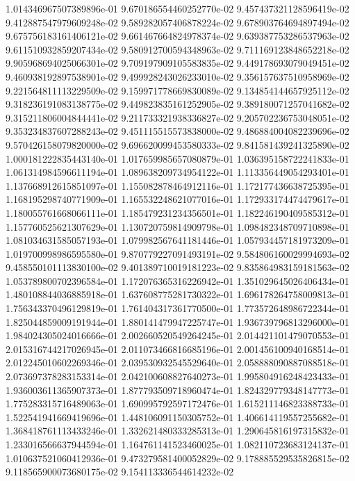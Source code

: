 1.014346967507389896e-01
9.670186554460252770e-02
9.457437321128596419e-02
9.412887547979609248e-02
9.589282057406878224e-02
9.678903764694897494e-02
9.675756183161406121e-02
9.661467664824978374e-02
9.639387753286537963e-02
9.611510932859207434e-02
9.580912700594348963e-02
9.711169123848652218e-02
9.905968694025066301e-02
9.709197909105583835e-02
9.449178693079049451e-02
9.460938192897538901e-02
9.499928243026233010e-02
9.356157637510958969e-02
9.221564811113229509e-02
9.159971778669830089e-02
9.134854144657925112e-02
9.318236191083138775e-02
9.449823835161252905e-02
9.389180071257041682e-02
9.315211806004844441e-02
9.211733321938336827e-02
9.205702236753048051e-02
9.353234837607288243e-02
9.451115515573838000e-02
9.486884004082239696e-02
9.570426158079820000e-02
9.696620099453580333e-02
9.841581439241325890e-02
1.000181222835443140e-01
1.017659985657080879e-01
1.036395158722241833e-01
1.061314984596611194e-01
1.089638209734954122e-01
1.113356449054293401e-01
1.137668912615851097e-01
1.155082878464912116e-01
1.172177436638725395e-01
1.168195298740771909e-01
1.165532248621077016e-01
1.172933174474479617e-01
1.180055761668066111e-01
1.185479231234356501e-01
1.182246190409585312e-01
1.157760525621307629e-01
1.130720759814909798e-01
1.098482348709710898e-01
1.081034631585057193e-01
1.079982567641181446e-01
1.057934457181973209e-01
1.019700998986595580e-01
9.870779227091493191e-02
9.584806160029994693e-02
9.458550101113830100e-02
9.401389710019181223e-02
9.835864983159181563e-02
1.053789800702396584e-01
1.172076365316226942e-01
1.351029645026406434e-01
1.480108844036885918e-01
1.637608775281730322e-01
1.696178264758009813e-01
1.756343370496129819e-01
1.761404317361770500e-01
1.773572648986722344e-01
1.825044859009191944e-01
1.880141479947225747e-01
1.936739796813296000e-01
1.984024305024016666e-01
2.002660520549264245e-01
2.014421101479070553e-01
2.015316744217026945e-01
2.011073466816685196e-01
2.001456100940168514e-01
2.012245010602269346e-01
2.039530932545529640e-01
2.058888090887088518e-01
2.073697378283153314e-01
2.042100608827640273e-01
1.995804916248423433e-01
1.936003611365907373e-01
1.877793509718960474e-01
1.824329779348147773e-01
1.775283315716489063e-01
1.690995792597172476e-01
1.615211146823388733e-01
1.522541941669419696e-01
1.448106091150305752e-01
1.406614119557255682e-01
1.368418761113433246e-01
1.332621480333285313e-01
1.290645816197315832e-01
1.233016566637944594e-01
1.164761141523460025e-01
1.082110723683124137e-01
1.010637521060412936e-01
9.473279581400052829e-02
9.178885529535826815e-02
9.118565900073680175e-02
9.154113336544614232e-02
